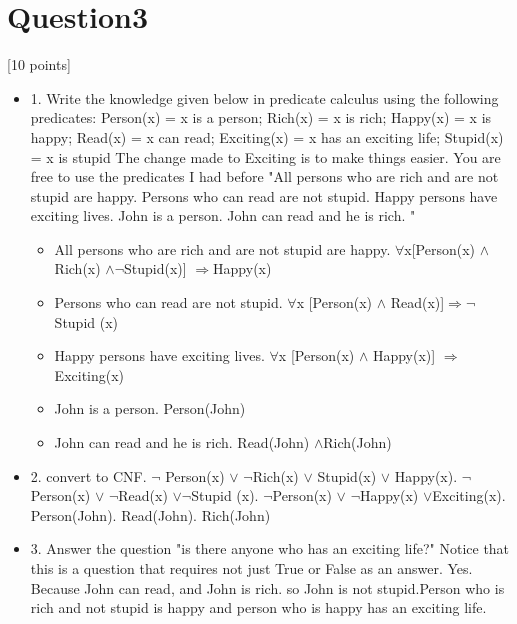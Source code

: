 \documentclass{article}
\begin{document}
\section{Question3}
[10 points]
\begin{itemize}
    
\item 1.    Write the knowledge given below in predicate calculus using the following predicates: Person(x) = x is a person; Rich(x) = x is rich; Happy(x) = x is happy; Read(x) = x can read; Exciting(x) = x has an exciting life; Stupid(x) = x is stupid 
The change made to Exciting is to make things easier. You are free to use the predicates I had before \newline
"All persons who are rich and are not stupid are happy. Persons who can read are not stupid. Happy persons have exciting lives. John is a person. John can read and he is rich. "
\begin{itemize}
    \item All persons who are rich and are not stupid are happy.\newline
    $\forall$x[Person(x) $\wedge$Rich(x) $\wedge$$\neg$Stupid(x)] $\Rightarrow$Happy(x)
    \item Persons who can read are not stupid.\newline
    $\forall$x [Person(x) $\wedge$ Read(x)]$\Rightarrow$$\neg$Stupid (x)
    \item Happy persons have exciting lives.\newline
    $\forall$x [Person(x) $\wedge$ Happy(x)] $\Rightarrow$Exciting(x)
    \item John is a person.\newline
    Person(John)
    \item John can read and he is rich.\newline
    Read(John) $\wedge$Rich(John)
\end{itemize}
\item 2.    convert to CNF.	$\neg$ Person(x) $\vee$ $\neg$Rich(x) $\vee$ Stupid(x) $\vee$ Happy(x).	$\neg$ Person(x) $\vee$ $\neg$Read(x) $\vee$$\neg$Stupid (x).	$\neg$Person(x) $\vee$ $\neg$Happy(x) $\vee$Exciting(x).	Person(John).	Read(John).	Rich(John)

\item 3.    Answer the question "is there anyone who has an exciting life?" Notice that this is a question that requires not just True or False as an answer.
\break
Yes. Because John can read, and John is rich. so John is not stupid.Person who is rich and not stupid is happy and person who is happy has an exciting life.
\end{itemize}
\end{document}
